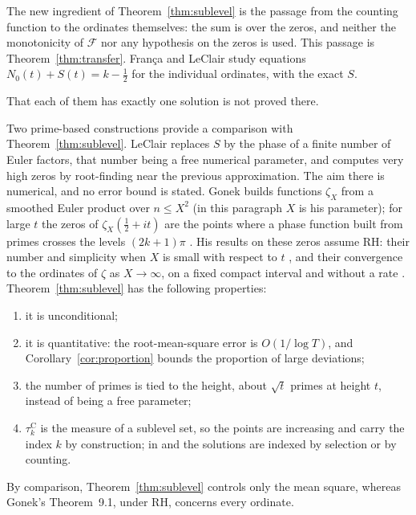 \documentclass[11pt,a4paper]{article}
\makeatletter
\numberwithin{equation}{section}
\DeclareRobustCommand{\CGref}[1]{\ref{#1}}
\DeclareRobustCommand{\CGcite}[2][]{\if\relax\detokenize{#1}\relax\cite{#2}\else\cite[#1]{#2}\fi}
\let\CG@origref\ref
\newcommand{\CG@gettip}[1]{\@ifundefined{CGTip@#1}{#1}{\csname CGTip@#1\endcsname}}
\newcommand{\CG@getbib}[1]{\@ifundefined{CGBib@#1}{#1}{\csname CGBib@#1\endcsname}}
\DeclareRobustCommand{\CGref}[1]{\pdftooltip{\CG@origref{#1}}{\CG@gettip{#1}}}
\DeclareRobustCommand{\CGcite}[2][]{\pdftooltip{\if\relax\detokenize{#1}\relax\cite{#2}\else\cite[#1]{#2}\fi}{\CG@getbib{#2}}}
\theoremstyle{definition}
\theoremstyle{remark}
\newcommand{\Nz}{N_0} %
\newcommand{\Fc}{\mathcal F}
\makeatother
\begin{document}
The new ingredient of Theorem~\CGref{thm:sublevel} is the passage from the counting function to the ordinates themselves: the sum is over the zeros, and neither the monotonicity of $\Fc$ nor any hypothesis on the zeros is used. This passage is Theorem~\CGref{thm:transfer}. Fran\c{c}a and LeClair \CGcite{FrancaLeClair2015} study equations $\Nz(t)+S(t)=k-\frac12$ for the individual ordinates, with the exact $S$.

That each of them has exactly one solution is not proved there.

Two prime-based constructions provide a comparison with Theorem~\CGref{thm:sublevel}. LeClair \CGcite[\S VI, eq.~(49)]{LeClair2016} replaces $S$ by the phase of a finite number of Euler factors, that number being a free numerical parameter, and computes very high zeros by root-finding near the previous approximation. The aim there is numerical, and no error bound is stated. Gonek \CGcite{Gonek2012} builds functions $\zeta_X$ from a smoothed Euler product over $n\le X^2$ (in this paragraph $X$ is his parameter); for large $t$ the zeros of $\zeta_X(\frac12+it)$ are the points where a phase function built from primes crosses the levels $(2k+1)\pi$ \CGcite[\S10]{Gonek2012}. His results on these zeros assume RH: their number and simplicity when $X$ is small with respect to $t$ \CGcite[Thm.~8.1]{Gonek2012}, and their convergence to the ordinates of $\zeta$ as $X\to\infty$, on a fixed compact interval and without a rate \CGcite[Thm.~9.1]{Gonek2012}. Theorem~\CGref{thm:sublevel} has the following properties:
\begin{enumerate}
\item it is unconditional;
\item it is quantitative: the root-mean-square error is $O(1/\log T)$, and Corollary~\CGref{cor:proportion} bounds the proportion of large deviations;
\item the number of primes is tied to the height, about $\sqrt t$ primes at height $t$, instead of being a free parameter;
\item $\tau_{k}^{\mathrm C}$ is the measure of a sublevel set, so the points are increasing and carry the index $k$ by construction; in \CGcite{LeClair2016} and \CGcite{Gonek2012} the solutions are indexed by selection or by counting.
\end{enumerate}
By comparison, Theorem~\CGref{thm:sublevel} controls only the mean square, whereas Gonek's Theorem~9.1, under RH, concerns every ordinate.
\end{document}
